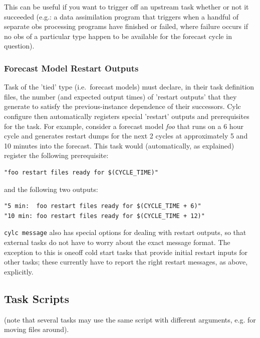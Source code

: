 \documentclass[11pt,a4paper]{article}
\begin{document}
This can be useful if you want to trigger off an upstream task whether
or not it succeeded (e.g.: a data assimilation program that triggers
when a handful of separate obs processing programs have finished or
failed, where failure occurs if no obs of a particular type happen to be
available for the forecast cycle in question).


\subsubsection{Forecast Model Restart Outputs}

Task of the 'tied' type (i.e.\ forecast models) must declare, in their
task definition files, the number (and expected output times) of
'restart outputs' that they generate to satisfy the previous-instance
dependence of their successors. Cylc configure then automatically
registers special 'restart' outputs and prerequisites for the task.
For example, consider a forecast model {\em foo} that runs on a
6 hour cycle and generates restart dumps for the next 2 cycles at
approximately 5 and 10 minutes into the forecast. This task would  
(automatically, as explained) register the following prerequisite:

\begin{lstlisting}
"foo restart files ready for $(CYCLE_TIME)"
\end{lstlisting}

and the following two outputs:

\begin{lstlisting}
"5 min:  foo restart files ready for $(CYCLE_TIME + 6)"
"10 min: foo restart files ready for $(CYCLE_TIME + 12)"
\end{lstlisting}

\lstinline=cylc message= also has special options for dealing with 
restart outputs, so that external tasks do not have to worry about the
exact message format. The exception to this is oneoff cold start tasks
that provide initial restart inputs for other tasks; these currently 
have to report the right restart messages, as above, explicitly.


\pagebreak
\subsection{Task Scripts}
\label{TaskScripts}

(note that several tasks may use the same script with different
arguments, e.g. for moving files around).
\end{document}
